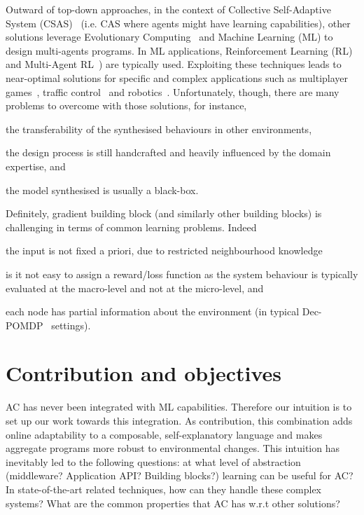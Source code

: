 \documentclass[conference]{IEEEtran}
\begin{document}
Outward of top-down approaches, in the context of Collective Self-Adaptive System (CSAS)~\cite{DBLP:conf/metacognition/Mitchell05} (i.e. CAS where agents might have learning capabilities), other solutions leverage Evolutionary Computing~\cite{DBLP:journals/swarm/BrambillaFBD13} and Machine Learning (ML) to design multi-agents programs. 
%
In ML applications, Reinforcement Learning (RL)~\cite{DBLP:journals/access/NaeemRC20} and Multi-Agent RL~\cite{DBLP:journals/tcyb/NguyenNN20}) are typically used.
%
Exploiting these techniques leads to near-optimal solutions for specific and complex applications such as multiplayer games~\cite{DBLP:journals/nature/VinyalsBCMDCCPE19, DBLP:journals/taas/HaoLM15}, traffic control~\cite{DBLP:journals/aes/JinMK17, DBLP:conf/icac/SteinTRH16} and robotics~\cite{DBLP:journals/taas/KraemerB14}.
%
Unfortunately, though, there are many problems to overcome with those solutions, for instance,
\begin{enumerate*}[label=(\roman*)]
    \item the transferability of the synthesised behaviours in other environments, 
    \item the design process is still handcrafted and heavily influenced by the domain expertise, and
    \item the model synthesised is usually a black-box.
\end{enumerate*}

Definitely, gradient building block (and similarly other building blocks) is challenging in terms of common learning problems. Indeed
\begin{enumerate*}[label=(\roman*)]
\item the input is not fixed a priori, due to restricted neighbourhood knowledge
\item is it not easy to assign a reward/loss function as the system behaviour is typically evaluated at the macro-level and not at the micro-level, and
\item each node has partial information about the environment (in typical Dec-POMDP~\cite{DBLP:conf/uai/BernsteinZI00} settings).
\end{enumerate*}
\section{Contribution and objectives}
AC has never been integrated with ML capabilities.
%
Therefore our intuition is to set up our work towards this integration.
%
As contribution, this combination adds online adaptability to a composable, self-explanatory language and makes aggregate programs more robust to environmental changes.
%
This intuition has inevitably led to the following questions: %
at what level of abstraction (middleware? Application API? Building blocks?) learning can be useful for AC?
%
In state-of-the-art related techniques, how can they handle these complex systems?
%
What are the common properties that AC has w.r.t other solutions?
\end{document}
